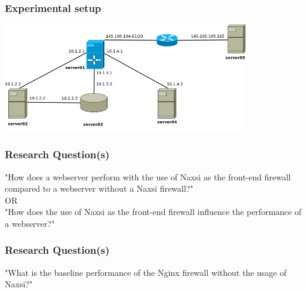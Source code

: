 \begin{frame}
  \frametitle{Experimental setup}
    \begin{center} 
      \includegraphics[width=0.80\textwidth]{../paper/images/infrastructure.png}
  \end{center}
\end{frame}


\begin{frame}
  \frametitle{Research Question(s)}
   \begin{center}
   \LARGE{"How does a webserver perform with the use of Naxsi as the front-end firewall
compared to a webserver without a Naxsi firewall?"}\\OR\\
   \LARGE{"How does the use of Naxsi as the front-end firewall influence the performance of a webserver?"}
  \end{center}
\end{frame}

\begin{frame}
  \frametitle{Research Question(s)}
   \begin{center}
   \LARGE{"What is the baseline performance of the Nginx firewall without the usage of Naxsi?"}
  \end{center}
\end{frame}
